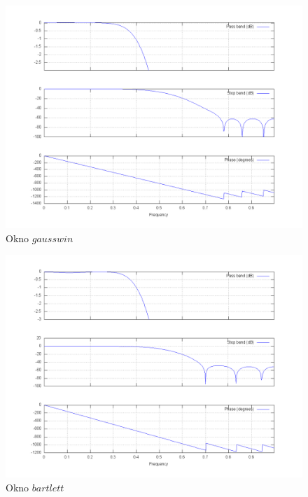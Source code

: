 \documentclass[wide,a4paper,titlepage,12pt]{mwart}
\begin{document}
	\begin{landscape}
	  \begin{figure}[htbp]
	    \begin{center}
	      \includegraphics[scale=.5]{out/fig7.png}
	      \caption{\label{fig7} Okno $gausswin$}
	    \end{center}
	  \end{figure}
	\end{landscape}
	
	\begin{landscape}
	  \begin{figure}[htbp]
	    \begin{center}
	      \includegraphics[scale=.5]{out/fig6.png}
	      \caption{\label{fig6} Okno $bartlett$}
	    \end{center}
	  \end{figure}
	\end{landscape}
	
\end{document}
